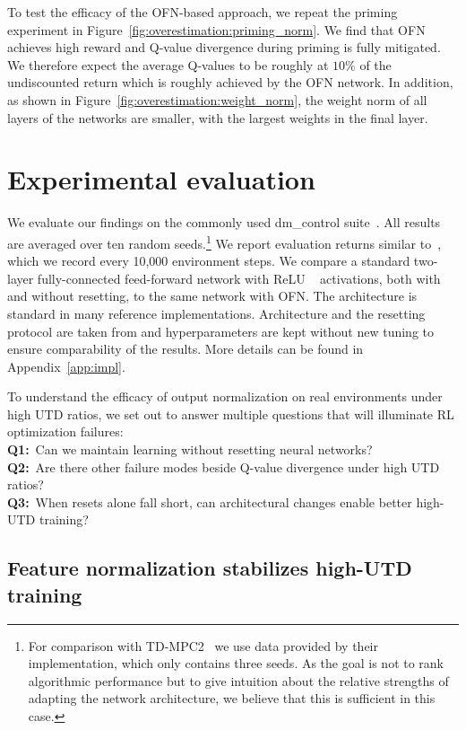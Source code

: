 To test the efficacy of the OFN-based approach, we repeat the priming experiment in Figure~\ref{fig:overestimation:priming_norm}.
We find that OFN achieves high reward and Q-value divergence during priming is fully mitigated. 
We therefore expect the average Q-values to be roughly at $10\%$ of the undiscounted return which is roughly achieved by the OFN network. 
In addition, as shown in Figure~\ref{fig:overestimation:weight_norm}, the weight norm of all layers of the networks are smaller, with the largest weights in the final layer.

\section{Experimental evaluation}

We evaluate our findings on the commonly used \textsf{dm\_control} suite~\parencite{tunyasuvunakool2020dmcontrol}. All results are averaged over ten random seeds.\footnote{For comparison with TD-MPC2~\parencite{hansen2024tdmpc} we use data provided by their implementation, which only contains three seeds. As the goal is not to rank algorithmic performance but to give intuition about the relative strengths of adapting the network architecture, we believe that this is sufficient in this case.} We report evaluation returns similar to~\textcite{nikishin2022primacy}, which we record every 10,000 environment steps. We compare a standard two-layer fully-connected feed-forward network with ReLU ~\parencite{nair2010rectified} activations, both with and without resetting, to the same network with OFN. %
The architecture is standard in many reference implementations. Architecture and the resetting protocol are taken from \textcite{doro2023barrier} and hyperparameters are kept without new tuning to ensure comparability of the results. More details can be found in Appendix~\ref{app:impl}.

To understand the efficacy of output normalization on real environments under high UTD ratios, we set out to answer multiple questions that will illuminate RL optimization failures:\\
{\bf Q1:}~Can we maintain learning without resetting neural networks?\\
{\bf Q2:}~Are there other failure modes beside Q-value divergence under high UTD ratios?\\
{\bf Q3:}~When resets alone fall short, can architectural changes enable better high-UTD training?

\subsection{Feature normalization stabilizes high-UTD training} 

